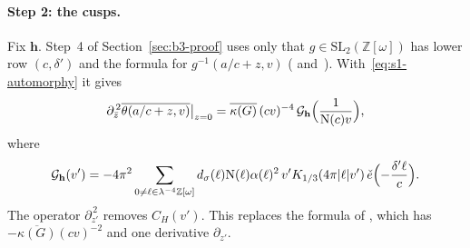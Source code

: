 \documentclass[11pt]{article}
\numberwithin{equation}{section}
\newcommand{\OO}{\mathbb Z[\omega]}
\newcommand{\N}{\mathrm N}
\newcommand{\ce}{\check e}
\begin{document}
\paragraph{Step 2: the cusps.} Fix $\mathbf h$. Step~4 of Section~\ref{sec:b3-proof} uses only that
$g\in\mathrm{SL}_2(\OO)$ has lower row $(c,\delta')$ and the formula for $g^{-1}(a/c+z,v)$ (\cite[proof of Proposition~5.1, \emph{Mellin normalization and continuation}]{OAI78} and~\cite[(5.1),
(5.19)]{QF}). With~\eqref{eq:s1-automorphy} it gives
\begin{equation}\label{eq:s1-cusp}
 \partial_{\bar z}^{\,2}\overline{\theta(a/c+z,v)}\big|_{z=0}
 =\overline{\kappa(G)}\,(cv)^{-4}\,\mathcal G_{\mathbf h}\Bigl(\frac1{\N(c)v}\Bigr),
\end{equation}
where
\begin{equation}\label{eq:d131}
 \mathcal G_{\mathbf h}(v')=-4\pi^2\sum_{0\ne\ell\in\lambda^{-4}\OO}d_\sigma(\ell)\N(\ell)\alpha(\ell)^2\,
 v'K_{1/3}(4\pi|\ell|v')\,\ce\Bigl(-\frac{\delta'\ell}c\Bigr).
\end{equation}
The operator $\partial_{z'}^{\,2}$ removes $C_H(v')$. This replaces the formula of \cite[proof of Proposition~5.1, \emph{Mellin normalization and continuation}]{OAI78}, which has
$-\overline{\kappa(G)}(cv)^{-2}$ and one derivative $\partial_{z'}$.
\end{document}
